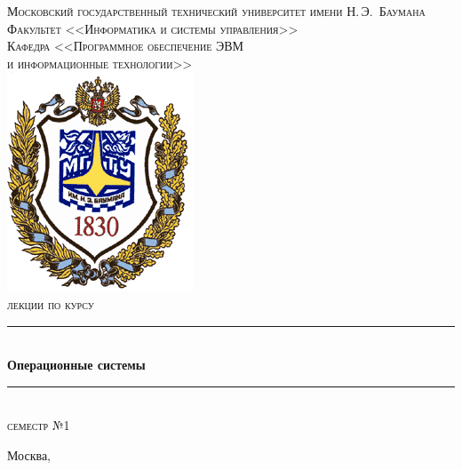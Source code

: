 \newcommand{\HRule}{\rule{\linewidth}{0.5mm}}

\begin{center}

\textsc{\large Московский государственный технический университет имени Н.\,Э.~Баумана}\\[0.5cm]
\textsc{Факультет <<Информатика и системы управления>>}\\
\textsc{Кафедра <<Программное обеспечение ЭВМ\\и информационные технологии>>}\\[0.25cm]

\includegraphics[scale=0.5]{assets/bmstu-logo.png}~\\[2.25cm]

\textsc{лекции по курсу}
\HRule \\[0.5cm]
{\huge \bfseries Операционные системы}
\HRule \\[0.5cm]
\textsc{\large семестр №1}\\

\vfill



{\large Москва, \the\year}

\end{center}

\newpage
{}